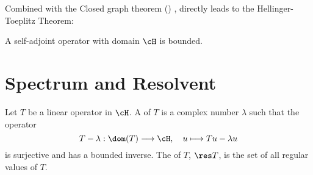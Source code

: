 \documentclass[oneside,reqno,letterpaper]{amsart}
\begin{document}
Combined with the Closed graph theorem () ,  directly leads to the Hellinger-Toeplitz Theorem: 
\begin{corollary}
\label{thm:hellinger-toeplitz}
  A self-adjoint operator with domain \(\cH\) is bounded. 
\end{corollary} 







\section{Spectrum and Resolvent}
\label{sec:spectrum-resolvent}


\begin{definition}
  Let \(T\) be a linear operator in \(\cH\).
  A  of \(T\) is a complex number \(\lambda\) such that the operator
  \[
    T - \lambda: \dom(T) \longrightarrow \cH, \quad u \longmapsto Tu - \lambda u 
  \] 
  is surjective and has a bounded inverse.\footnotemark 
  The  of \(T\), \(\res T\), is the set of all regular values of \(T\). 
\end{definition}
\end{document}
